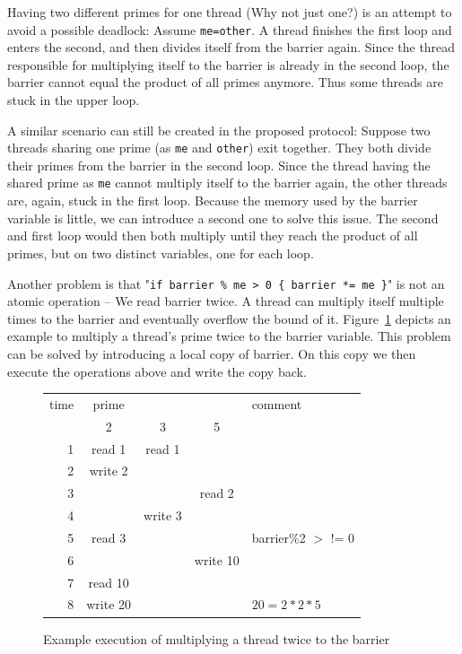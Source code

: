 \documentclass[a4paper, 10pt]{article}
\begin{document}
Having two different primes for one thread (Why not just one?) is an attempt to avoid a possible deadlock: Assume \texttt{me=other}. A thread finishes the first loop and enters the second, and then divides itself from the barrier again. Since the thread responsible for multiplying itself to the barrier is already in the second loop, the barrier cannot equal the product of all primes anymore. Thus some threads are stuck in the upper loop.

A similar scenario can still be created in the proposed protocol: Suppose two threads sharing one prime (as \texttt{me} and \texttt{other}) exit together. They both divide their primes from the barrier in the second loop. Since the thread having the shared prime as \texttt{me} cannot multiply itself to the barrier again, the other threads are, again, stuck in the first loop. Because the memory used by the barrier variable is little, we can introduce a second one to solve this issue. The second and first loop would then both multiply until they reach the product of all primes, but on two distinct variables, one for each loop.

Another problem is that "\texttt{if~barrier~\%~me~>~0~\{~barrier~*=~me~\}}" is not an atomic operation -- We read barrier twice. A thread can multiply itself multiple times to the barrier and eventually overflow the bound of it. Figure~\ref{fig:deadlock1} depicts an example to multiply a thread's prime twice to the barrier variable. This problem can be solved by introducing a local copy of barrier. On this copy we then execute the operations above and write the copy back.
\begin{figure}[htbp]
	\centering
	\begin{tabular}{r | c c c | l}
		time & prime    &         &          & comment \\
			 & 2        & 3       & 5        &         \\
		\hline
		1    & read 1   & read 1  &          &         \\
		2    & write 2  &         &          &         \\
		3    &          &         & read 2   &         \\
		4    &          & write 3 &          &         \\
		5    & read 3   &         &          & barrier\%2 $>$ != 0 \\
		6    &          &         & write 10 &         \\
		7    & read 10  &         &          &         \\
		8    & write 20 &         &          & $20 = 2 * 2 * 5$ \\
	\end{tabular}
	\caption{Example execution of multiplying a thread twice to the barrier}
	\label{fig:deadlock1}
\end{figure}
\end{document}
